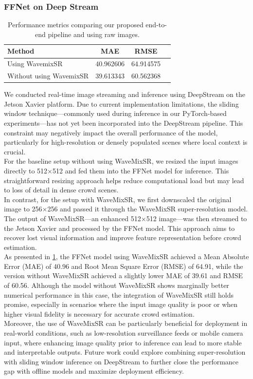 \subsubsection{FFNet on Deep Stream}
\begin{table}[H]
\centering
\begin{tabular}{@{}lccc@{}}
\toprule
\textbf{Method} & \textbf{MAE} & \textbf{RMSE} \\ \midrule
Using WavemixSR    & 40.962606          & 64.914575          \\ 
Without using WavemixSR    & 39.613343         & 60.562368        \\
\end{tabular}
\caption{Performance metrics comparing our proposed end-to-end pipeline and using raw images.}
\label{tab:deepstream_metrics}
\end{table}
We conducted real-time image streaming and inference using DeepStream on the Jetson Xavier platform. Due to current implementation limitations, the sliding window technique—commonly used during inference in our PyTorch-based experiments—has not yet been incorporated into the DeepStream pipeline. This constraint may negatively impact the overall performance of the model, particularly for high-resolution or densely populated scenes where local context is crucial.\\
For the baseline setup without using WaveMixSR, we resized the input images directly to 512×512 and fed them into the FFNet model for inference. This straightforward resizing approach helps reduce computational load but may lead to loss of detail in dense crowd scenes.\\
In contrast, for the setup with WaveMixSR, we first downscaled the original image to 256×256 and passed it through the WaveMixSR super-resolution model. The output of WaveMixSR—an enhanced 512×512 image—was then streamed to the Jetson Xavier and processed by the FFNet model. This approach aims to recover lost visual information and improve feature representation before crowd estimation.\\
As presented in \ref{tab:deepstream_metrics}, the FFNet model using WaveMixSR achieved a Mean Absolute Error (MAE) of 40.96 and Root Mean Square Error (RMSE) of 64.91, while the version without WaveMixSR achieved a slightly lower MAE of 39.61 and RMSE of 60.56. Although the model without WaveMixSR shows marginally better numerical performance in this case, the integration of WaveMixSR still holds promise, especially in scenarios where the input image quality is poor or when higher visual fidelity is necessary for accurate crowd estimation.\\
Moreover, the use of WaveMixSR can be particularly beneficial for deployment in real-world conditions, such as low-resolution surveillance feeds or mobile camera input, where enhancing image quality prior to inference can lead to more stable and interpretable outputs. Future work could explore combining super-resolution with sliding window inference on DeepStream to further close the performance gap with offline models and maximize deployment efficiency.